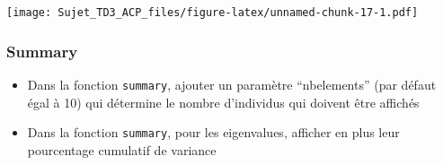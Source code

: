 \documentclass[
]{article}
\providecommand{\tightlist}{%
  \setlength{\itemsep}{0pt}\setlength{\parskip}{0pt}}
\begin{document}
\texttt{[image: Sujet\_TD3\_ACP\_files/figure-latex/unnamed-chunk-17-1.pdf]}

\hypertarget{summary}{%
\subsubsection{Summary}\label{summary}}

\begin{itemize}
\tightlist
\item
  Dans la fonction \texttt{summary}, ajouter un paramètre ``nbelements''
  (par défaut égal à 10) qui détermine le nombre d'individus qui doivent
  être affichés
\item
  Dans la fonction \texttt{summary}, pour les eigenvalues, afficher en
  plus leur pourcentage cumulatif de variance
\end{itemize}
\end{document}
